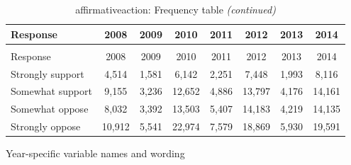 \documentclass[
  12pt]{article}
\begin{document}
\begin{longtable}[t]{lccccccc}
\caption{\label{tab:unnamed-chunk-5}affirmativeaction: Frequency table}\\
\toprule
Response & 2008 & 2009 & 2010 & 2011 & 2012 & 2013 & 2014\\
\midrule
\endfirsthead
\caption[]{affirmativeaction: Frequency table \textit{(continued)}}\\
\toprule
Response & 2008 & 2009 & 2010 & 2011 & 2012 & 2013 & 2014\\
\midrule
\endhead

\endfoot
\bottomrule
\endlastfoot
Strongly support & 4,514 & 1,581 & 6,142 & 2,251 & 7,448 & 1,993 & 8,116\\
Somewhat support & 9,155 & 3,236 & 12,652 & 4,886 & 13,797 & 4,176 & 14,161\\
Somewhat oppose & 8,032 & 3,392 & 13,503 & 5,407 & 14,183 & 4,219 & 14,135\\
Strongly oppose & 10,912 & 5,541 & 22,974 & 7,579 & 18,869 & 5,930 & 19,591\\*
\end{longtable}
\endgroup{}

Year-specific variable names and
wording\begingroup\fontsize{11}{13}\selectfont
\end{document}
